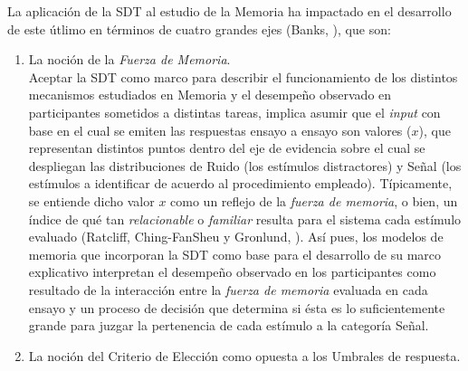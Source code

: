 La aplicación de la SDT al estudio de la Memoria ha impactado en el desarrollo de este útlimo en términos de cuatro grandes ejes (Banks, \citeyear{Banks1970}), que son:\\

\begin{enumerate}
\item La noción de la \textit{Fuerza de Memoria}.\\

Aceptar la SDT como marco para describir el funcionamiento de los distintos mecanismos estudiados en Memoria y el desempeño observado en participantes sometidos a distintas tareas, implica asumir que el \textit{input} con base en el cual se emiten las respuestas ensayo a ensayo son valores ($x$), que representan distintos puntos dentro del eje de evidencia sobre el cual se despliegan las distribuciones de Ruido (los estímulos distractores) y Señal (los estímulos a identificar de acuerdo al procedimiento empleado). Típicamente, se entiende dicho valor $x$ como un reflejo de la \textit{fuerza de memoria}, o bien, un índice de qué tan \textit{relacionable} o \textit{familiar} resulta para el sistema cada estímulo evaluado (Ratcliff, Ching-FanSheu y Gronlund, \citeyear{Ratcliff1992}). Así pues, los modelos de memoria que incorporan la SDT como base para el desarrollo de su marco explicativo interpretan el desempeño observado en los participantes como resultado de la interacción entre la \textit{fuerza de memoria} evaluada en cada ensayo y un proceso de decisión que determina si ésta es lo suficientemente grande para juzgar la pertenencia de cada estímulo a la categoría Señal.\\


\item La noción del Criterio de Elección como opuesta a los Umbrales de respuesta.\\


\end{enumerate}
